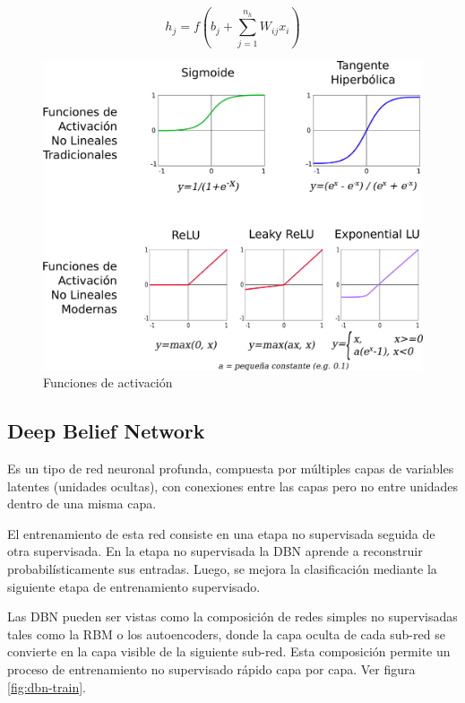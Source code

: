 \begin{equation}
	\label{eq:mlp-out}
	h_j = f(b_j + \sum_{j=1}^{n_h} W_{ij} x_i)
\end{equation}

\begin{figure}[htbp]
	\centering
	\includegraphics[width=0.8\linewidth]{graficos/propios/funciones_de_activacion.png}
	\caption{Funciones de activación \citep{sze2017efficient}}
	\label{fig:mlp-activation}
\end{figure}

\subsection{Deep Belief Network}

Es un tipo de red neuronal profunda, compuesta por múltiples capas de variables latentes (unidades ocultas), con conexiones entre las capas pero no entre unidades dentro de una misma capa.

El entrenamiento de esta red consiste en una etapa no supervisada seguida de otra supervisada. En la etapa no supervisada la \ac{DBN} aprende a reconstruir probabilísticamente sus entradas. Luego, se mejora la clasificación mediante la siguiente etapa de entrenamiento supervisado.

Las \ac{DBN} pueden ser vistas como la composición de redes simples no supervisadas tales como la \ac{RBM} o los autoencoders, donde la capa oculta de cada sub-red se convierte en la capa visible de la siguiente sub-red. Esta composición permite un proceso de entrenamiento no supervisado rápido capa por capa. Ver figura \ref{fig:dbn-train}.

